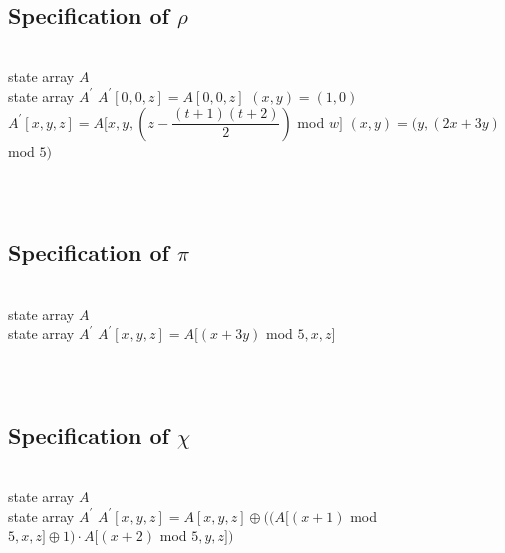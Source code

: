 \documentclass[12pt,a4paper,oneside]{report}
\newcommand{\inputmintedindent}[2]{
    \begin{minipage}{0.1\linewidth}\end{minipage}
    \begin{minipage}{0.85\linewidth}
        \inputminted[linenos,breaklines,fontsize=\footnotesize]{#1}{#2}
    \end{minipage}\\[0.5em]
}
\begin{document}
\inputmintedindent{C}{code_split/sha3_step_theta.c}


\subsection{Specification of $\rho$}
\begin{algorithm}[H]
    \begin{algorithmic}
        \Require \\
        state array $A$
        \Ensure \\
        state array $A^{'}$
                \State $A^{'}[0,0,z]=A[0,0,z]$
            \EndFor
            \State $(x,y)=(1,0)$
                    \State $A^{'}[x,y,z]=A[x,y,(z-\dfrac{(t+1)(t+2)}{2})$ mod $w]$
                \EndFor
                \State $(x,y)=(y,(2x+3y)$ mod $5)$
            \EndFor
            \State {}  
        \EndFunction  
    \end{algorithmic}  
\end{algorithm}

\inputmintedindent{C}{code_split/sha3_step_rho.c}


\subsection{Specification of $\pi$}
\begin{algorithm}[H]
    \begin{algorithmic}
        \Require \\
        state array $A$
        \Ensure \\
        state array $A^{'}$
               \State $A^{'}[x,y,z]=A[(x+3y)$ mod $5,x,z]$
            \EndFor
            \State {}  
        \EndFunction  
    \end{algorithmic}  
\end{algorithm}

\inputmintedindent{C}{code_split/sha3_step_pi.c}


\subsection{Specification of $\chi$}
\begin{algorithm}[H]
    \begin{algorithmic}
        \Require \\
        state array $A$
        \Ensure \\
        state array $A^{'}$
                \State $A^{'}[x,y,z]=A[x,y,z] \oplus ((A[(x+1)$ mod $5,x,z] \oplus 1) \cdot A[(x+2)$ mod $5,y,z])$
            \EndFor
            \State {}  
        \EndFunction  
    \end{algorithmic}  
\end{algorithm}
\end{document}
